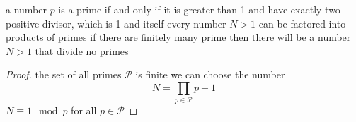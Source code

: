

\label{of prime}
a number $p$ is a prime if and only if it is greater than 1 and have exactly two positive divisor, which is 1 and itself
every number $N > 1$ can be factored into products of primes
if there are finitely many prime then there will
be a number $N > 1$ that divide no primes
\begin{proof}
the set of all primes $\mathcal P$ is finite
we can choose the number
$$N = \prod_{p \in \mathcal P} p + 1$$
$N \equiv 1 \mod p $ for all $p \in \mathcal P$

\end{proof}
